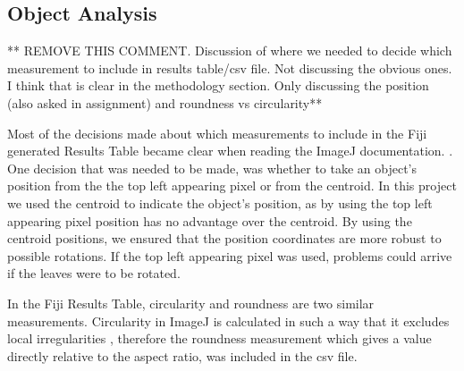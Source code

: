 \documentclass[paper=A4,bibliography=totocnumbered]{scrartcl}
\begin{document}
\subsection{Object Analysis}
** REMOVE THIS COMMENT. Discussion of where we needed to decide which measurement to include in results table/csv file. Not discussing the obvious ones. I think that is clear in the methodology section. Only discussing the position (also asked in assignment) and roundness vs circularity**

Most of the decisions made about which measurements to include in the Fiji generated Results Table became clear when reading the ImageJ documentation. \citep{Ferreira.2012}. One decision that was needed to be made, was whether to take an object's position from the the top left appearing pixel or from the centroid. In this project we used the centroid to indicate the object's position, as by using the top left appearing pixel position has no advantage over the centroid. By using the centroid positions, we ensured that the position coordinates are more robust to possible rotations. If the top left appearing pixel was used, problems could arrive if the leaves were to be rotated. 

In  the Fiji Results Table, circularity and roundness are two similar measurements. Circularity in ImageJ is calculated in such a way that it excludes local irregularities \citep{Wirth.2004} , therefore the roundness measurement which gives a value directly relative to the aspect ratio, was included in the csv file.



\renewcommand\bibname{References} %

\end{document}
